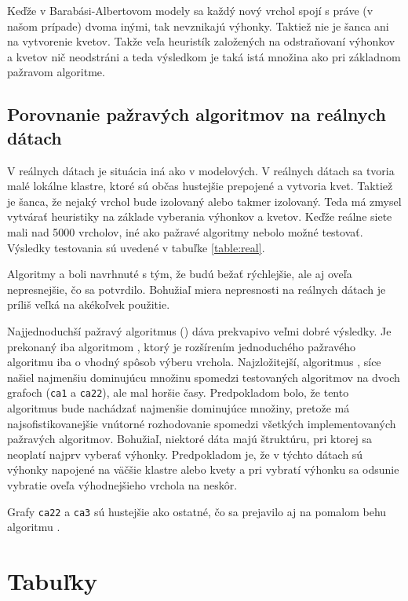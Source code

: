 Keďže v Barabási-Albertovom modely sa každý nový vrchol spojí s práve (v našom 
prípade) dvoma inými, tak nevznikajú výhonky. Taktiež nie je šanca ani na 
vytvorenie kvetov. Takže veľa heuristík založených na odstraňovaní výhonkov a 
kvetov nič neodstráni a teda výsledkom je taká istá množina ako pri základnom 
pažravom algoritme.

\subsection{Porovnanie pažravých algoritmov na reálnych dátach}

V reálnych dátach je situácia iná ako v modelových. V reálnych dátach sa tvoria 
malé lokálne klastre, ktoré sú občas hustejšie prepojené a vytvoria kvet. 
Taktiež je šanca, že nejaký vrchol bude izolovaný alebo takmer izolovaný. Teda 
má zmysel vytvárať heuristiky na základe vyberania výhonkov a kvetov. Keďže 
reálne siete mali nad 5000 vrcholov, iné ako pažravé algoritmy nebolo možné 
testovať. Výsledky testovania sú uvedené v tabuľke \ref{table:real}. 

Algoritmy  a  boli navrhnuté s tým, že budú bežať 
rýchlejšie, ale aj oveľa nepresnejšie, čo sa potvrdilo. Bohužiaľ miera 
nepresnosti na reálnych dátach je príliš veľká na akékoľvek použitie.

Najjednoduchší pažravý algoritmus () dáva 
prekvapivo veľmi dobré výsledky. Je prekonaný iba algoritmom , 
ktorý je rozšírením jednoduchého pažravého algoritmu iba o vhodný spôsob 
výberu vrchola. Najzložitejší, algoritmus , síce našiel najmenšiu 
dominujúcu množinu spomedzi testovaných algoritmov na dvoch grafoch 
(\texttt{ca1} a \texttt{ca22}), ale mal horšie časy. Predpokladom bolo, že 
tento algoritmus bude nachádzať najmenšie dominujúce množiny, pretože má 
najsofistikovanejšie vnútorné rozhodovanie spomedzi všetkých implementovaných 
pažravých algoritmov. Bohužiaľ, niektoré dáta majú štruktúru, pri ktorej sa 
neoplatí najprv vyberať výhonky. Predpokladom je, že v týchto dátach sú 
výhonky napojené na väčšie klastre alebo kvety a pri vybratí výhonku sa odsunie 
vybratie oveľa výhodnejšieho vrchola na neskôr.

Grafy \texttt{ca22} a \texttt{ca3} sú hustejšie ako ostatné, čo sa prejavilo aj 
na pomalom behu algoritmu .

\section{Tabuľky}

